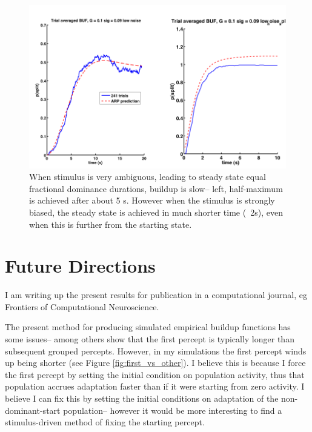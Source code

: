 \documentclass[10pt]{article}
\begin{document}
\begin{figure}[scale=0.5]
   \begin{center}
   
   \includegraphics[scale=0.33]{../ambiguous_vs_biased}
   
   \caption{When stimulus is very ambiguous, leading to steady state equal fractional dominance durations, buildup is slow-- left, half-maximum is achieved after about 5 s. However when the stimulus is strongly biased, the steady state is achieved in much shorter time (~2s), even when this is further from the starting state.}
   	\label{fig:ambiguous_vs_biased}
   \end{center}
\end{figure}
%




\section*{Future Directions}
I am writing up the present results for publication in a computational journal, eg Frontiers of Computational Neuroscience.

The present method for producing simulated empirical buildup functions has some issues-- \cite{Hupe2012} among others show that the first percept is typically longer than subsequent grouped percepts. However, in my simulations the first percept winds up being shorter (see Figure \ref{fig:first_vs_other}). I believe this is because I force the first percept by setting the initial condition on population activity, thus that population accrues adaptation faster than if it were starting from zero activity. I believe I can fix this by setting the initial conditions on adaptation of the non-dominant-start population-- however it would be more interesting to find a stimulus-driven method of fixing the starting percept.
\end{document}
